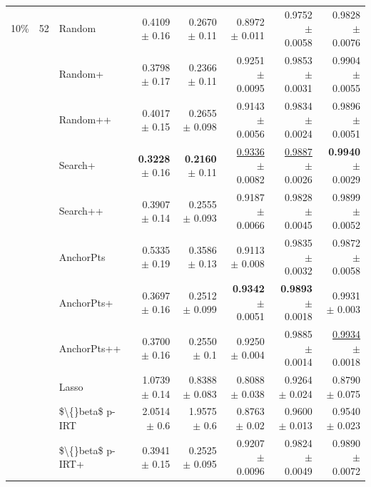 \begin{longtable}{llp{}rrrrr}
\midrule
10\% & 52 & Random & 0.4109 {\scriptsize $\pm$ 0.16} & 0.2670 {\scriptsize $\pm$ 0.11} & 0.8972 {\scriptsize $\pm$ 0.011} & 0.9752 {\scriptsize $\pm$ 0.0058} & 0.9828 {\scriptsize $\pm$ 0.0076} \\
 &  & Random+ & 0.3798 {\scriptsize $\pm$ 0.17} & 0.2366 {\scriptsize $\pm$ 0.11} & 0.9251 {\scriptsize $\pm$ 0.0095} & 0.9853 {\scriptsize $\pm$ 0.0031} & 0.9904 {\scriptsize $\pm$ 0.0055} \\
 &  & Random++ & 0.4017 {\scriptsize $\pm$ 0.15} & 0.2655 {\scriptsize $\pm$ 0.098} & 0.9143 {\scriptsize $\pm$ 0.0056} & 0.9834 {\scriptsize $\pm$ 0.0024} & 0.9896 {\scriptsize $\pm$ 0.0051} \\
 &  & Search+ & \textbf{0.3228} {\scriptsize $\pm$ 0.16} & \textbf{0.2160} {\scriptsize $\pm$ 0.11} & \underline{0.9336} {\scriptsize $\pm$ 0.0082} & \underline{0.9887} {\scriptsize $\pm$ 0.0026} & \textbf{0.9940} {\scriptsize $\pm$ 0.0029} \\
 &  & Search++ & 0.3907 {\scriptsize $\pm$ 0.14} & 0.2555 {\scriptsize $\pm$ 0.093} & 0.9187 {\scriptsize $\pm$ 0.0066} & 0.9828 {\scriptsize $\pm$ 0.0045} & 0.9899 {\scriptsize $\pm$ 0.0052} \\
 &  & AnchorPts & 0.5335 {\scriptsize $\pm$ 0.19} & 0.3586 {\scriptsize $\pm$ 0.13} & 0.9113 {\scriptsize $\pm$ 0.008} & 0.9835 {\scriptsize $\pm$ 0.0032} & 0.9872 {\scriptsize $\pm$ 0.0058} \\
 &  & AnchorPts+ & 0.3697 {\scriptsize $\pm$ 0.16} & 0.2512 {\scriptsize $\pm$ 0.099} & \textbf{0.9342} {\scriptsize $\pm$ 0.0051} & \textbf{0.9893} {\scriptsize $\pm$ 0.0018} & 0.9931 {\scriptsize $\pm$ 0.003} \\
 &  & AnchorPts++ & 0.3700 {\scriptsize $\pm$ 0.16} & 0.2550 {\scriptsize $\pm$ 0.1} & 0.9250 {\scriptsize $\pm$ 0.004} & 0.9885 {\scriptsize $\pm$ 0.0014} & \underline{0.9934} {\scriptsize $\pm$ 0.0018} \\
 &  & Lasso & 1.0739 {\scriptsize $\pm$ 0.14} & 0.8388 {\scriptsize $\pm$ 0.083} & 0.8088 {\scriptsize $\pm$ 0.038} & 0.9264 {\scriptsize $\pm$ 0.024} & 0.8790 {\scriptsize $\pm$ 0.075} \\
 &  & \$\textbackslash\{\}beta\$ p-IRT & 2.0514 {\scriptsize $\pm$ 0.6} & 1.9575 {\scriptsize $\pm$ 0.6} & 0.8763 {\scriptsize $\pm$ 0.02} & 0.9600 {\scriptsize $\pm$ 0.013} & 0.9540 {\scriptsize $\pm$ 0.023} \\
 &  & \$\textbackslash\{\}beta\$ p-IRT+ & 0.3941 {\scriptsize $\pm$ 0.15} & 0.2525 {\scriptsize $\pm$ 0.095} & 0.9207 {\scriptsize $\pm$ 0.0096} & 0.9824 {\scriptsize $\pm$ 0.0049} & 0.9890 {\scriptsize $\pm$ 0.0072} \\

\end{longtable}
